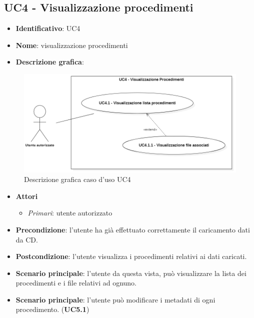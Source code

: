 
\subsection{UC4 - Visualizzazione procedimenti}
\begin{itemize}
  \item \textbf{Identificativo}: UC4
  \item \textbf{Nome}: visualizzazione procedimenti
  \item \textbf{Descrizione grafica}:
\end{itemize}

\begin{figure}[H]
  \centering
  \includegraphics[width=\textwidth]{immagini/usecase/UC4.png}
  \caption{Descrizione grafica caso d'uso UC4}
\end{figure}

\begin{itemize}
  \item \textbf{Attori}
        \begin{itemize}
          \item \textit{Primari}: utente autorizzato
        \end{itemize}
  \item \textbf{Precondizione}: l'utente ha già effettuato correttamente il caricamento dati da CD.
  \item \textbf{Postcondizione}: l'utente visualizza i procedimenti relativi ai dati caricati.
  \item \textbf{Scenario principale}: l'utente da questa vista, può visualizzare la lista dei procedimenti e i file relativi ad ognuno.
  \item \textbf{Scenario principale}: l'utente può modificare i metadati di ogni procedimento. (\textbf{UC5.1})
\end{itemize}

